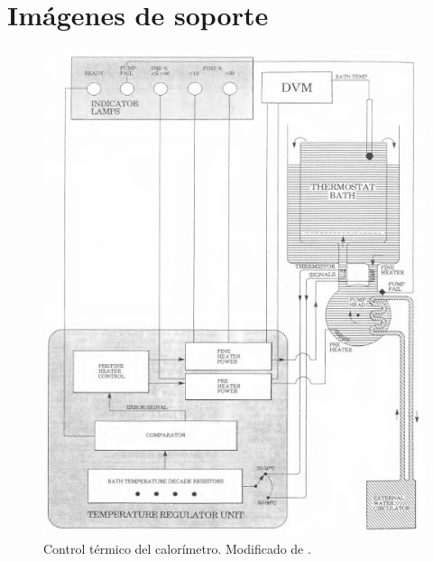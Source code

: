 
%




\chapter{Imágenes de soporte}\label{anx: imagenes}
	\begin{figure}[!h]
		\centering
		\includegraphics[height =0.65\textheight]{Figures/controlTemperatura}
		\caption{Control t\'ermico del calor\'imetro. Modificado de \cite{Suurkuusk}.}
		\label{fig: controlTermico}
	\end{figure}

